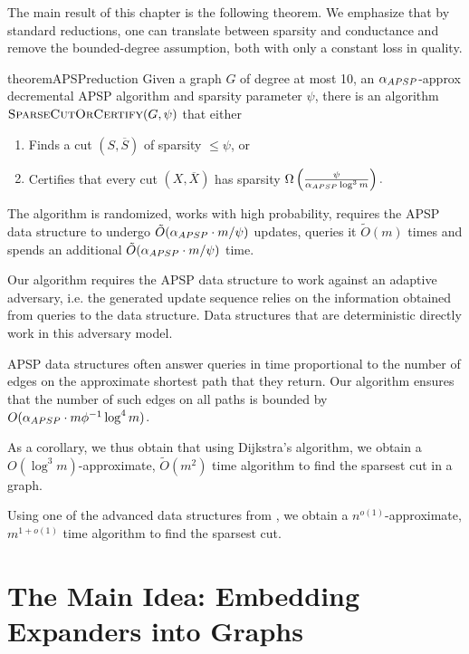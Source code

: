 The main result of this chapter is the following theorem. We emphasize that by standard reductions, one can translate between sparsity and conductance and remove the bounded-degree assumption, both with only a constant loss in quality. 

\begin{restatable}{theorem}{APSPreduction}\label{thm:fineGrainedReduction}
\label{theorem:balanceCut}
Given a graph $G$ of degree at most 10, an $\alpha_{APSP}$-approx decremental APSP algorithm and sparsity parameter $\psi$, there is an algorithm $\textsc{SparseCutOrCertify}(G, \psi)$ that either
\begin{enumerate}
    \item\label{case:balanceCut} Finds a cut $(S, \overline{S})$ of sparsity $\leq \psi$, or
    \item\label{case:noBalanceCut}
     Certifies that every cut $(X, \overline{X})$ has sparsity
  $\Omega\left(\frac{\psi}{\alpha_{APSP} \log^3 m}\right).$
\end{enumerate}
The algorithm is randomized, works with high probability, requires the APSP data structure to undergo $\tilde{O}( \alpha_{APSP} \cdot m/ \psi )$ updates, queries it $\tilde{O}(m)$ times and spends an additional $\tilde{O}( \alpha_{APSP} \cdot m/ \psi)$ time.
\end{restatable}
\begin{remark}
Our algorithm requires the APSP data structure to work against an adaptive adversary, i.e. the generated update sequence relies on the information obtained from queries to the data structure. Data structures that are deterministic directly work in this adversary model.
\end{remark}
\begin{remark}
APSP data structures often answer queries in time proportional to the number of edges on the approximate shortest path that they return. Our algorithm ensures that the number of such edges on all paths is bounded by $O( \alpha_{APSP} \cdot m \phi^{-1} \log^4 m)$.
\end{remark}

As a corollary, we thus obtain that using Dijkstra's algorithm, we obtain a $O(\log^3 m)$-approximate, $\tilde{O}(m^2)$ time algorithm to find the sparsest cut in a graph. 

Using one of the advanced data structures from \cite{chuzhoy2021decremental,bernstein2022deterministic}, we obtain a $n^{o(1)}$-approximate, $m^{1+o(1)}$ time algorithm to find the sparsest cut.

\section{The Main Idea: Embedding Expanders into Graphs}

